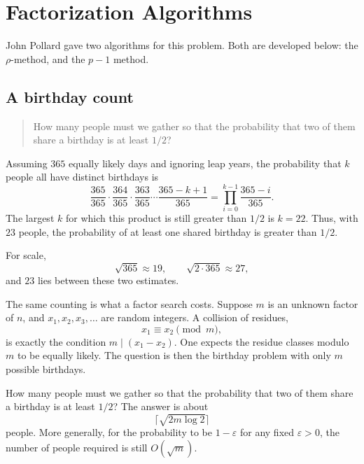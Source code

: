 
\section{Factorization Algorithms}

John Pollard gave two algorithms for this problem. Both are developed below: the $\rho$-method, and the $p-1$ method.

\subsection{A birthday count}

\begin{quote}
How many people must we gather so that the probability that two of them share a birthday is at least $1/2$?
\end{quote}

Assuming $365$ equally likely days and ignoring leap years, the probability that $k$ people all have distinct birthdays is
\[
    \frac{365}{365}\cdot\frac{364}{365}\cdot\frac{363}{365}\cdots\frac{365-k+1}{365}
    = \prod_{i=0}^{k-1}\frac{365-i}{365}.
\]
The largest $k$ for which this product is still greater than $1/2$ is $k=22$. Thus, with $23$ people, the probability of at least one shared birthday is greater than $1/2$.

For scale,
\[
    \sqrt{365}\approx 19, \qquad \sqrt{2\cdot 365}\approx 27,
\]
and $23$ lies between these two estimates.

The same counting is what a factor search costs. Suppose $m$ is an unknown factor of $n$, and $x_1,x_2,x_3,\ldots$ are random integers. A collision of residues,
\[
    x_1\equiv x_2\pmod{m},
\]
is exactly the condition $m\mid(x_1-x_2)$.
One expects the residue classes modulo $m$ to be equally likely. The question is then the birthday problem with only $m$ possible birthdays.


How many people must we gather so that the probability that two of them share a birthday is at least $1/2$? The answer is about
\[
    \bigl\lceil\sqrt{2m\log 2}\bigr\rceil
\]
people. More generally, for the probability to be $1-\varepsilon$ for any fixed $\varepsilon>0$, the number of people required is still $O(\sqrt{m})$.

